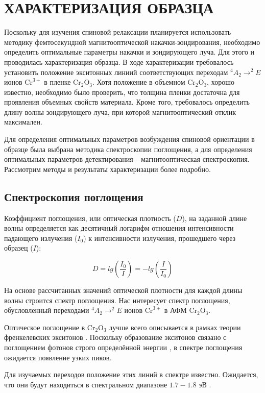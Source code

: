 \documentclass[14pt]{extarticle}
\newcommand{\crome}{\mathrm{Cr}_{2}\mathrm{O}_{3}}
\numberwithin{equation}{section}
\begin{document}
\newpage
\section{ХАРАКТЕРИЗАЦИЯ ОБРАЗЦА}
Поскольку для изучения спиновой релаксации планируется использовать методику фемтосекундной магнитооптической накачки-зондирования, необходимо определить оптимальные параметры накачки и зондирующего луча. Для этого и проводилась характеризация образца. В ходе характеризации требовалось установить   положение экситонных линиий соответствующих переходам  $^4A_2 \longrightarrow ^2E$ ионов $\mathrm{Cr}^{3+}$ в пленке $\crome$. Хотя положение  в объемном $\crome$,  хорошо известно, необходимо было проверить, что толщина пленки достаточна для проявления объемных свойств материала. Кроме того, требовалось определить длину волны зондирующего луча, при которой магнитооптический отклик максимален.

Для определения оптимальных параметров возбуждения спиновой ориентации в образце была выбрана методика спектроскопии поглощения, а для определения оптимальных параметров детектирования$ -$ магнитооптическая спектроскопия. Рассмотрим методы и результаты характеризации более подробно.

\subsection{Спектроскопия поглощения}

Коэффициент поглощения, или оптическая плотность ($D$), на заданной длине волны определяется как  десятичный логарифм отношения интенсивности падающего излучения ($I_0$) к интенсивности излучения, прошедшего через образец ($I$):

\begin{equation}
D = lg\left(\frac{I_0}{I}\right) = -lg \left(\frac{I}{I_0}\right)
\end{equation}

На основе рассчитанных значений оптической плотности для каждой длины волны строится спектр поглощения. Нас интересует спектр поглощения, обусловленный переходами $^4A_2 \longrightarrow ^2E$ ионов $\mathrm{Cr}^{3+}$ в АФМ $\crome$. 

Оптическое поглощение в $\crome$ лучше всего описывается в рамках теории френкелевских экситонов \cite{VanderZiel}.
Поскольку образование экситонов связано с поглощением фотонов строго определённой энергии \cite{Piter}, в спектре поглощения ожидается появление узких пиков.

Для изучаемых переходов положение этих линий в спектре известно. Ожидается, что они будут находиться в спектральном диапазоне  $1.7 - 1.8$ эВ \cite{Pavlov}.
\end{document}

